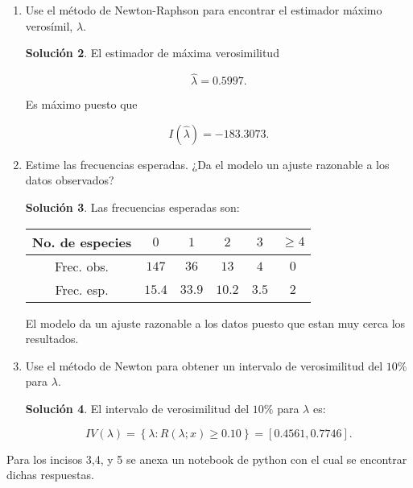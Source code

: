 \documentclass[letterpaper]{article}
\theoremstyle{definition}
\theoremstyle{lemathm}
\theoremstyle{lemathm}
\newtheorem{sol}{Solución}
\theoremstyle{lemathm}
\theoremstyle{lemademthm}
\newcommand{\pars}[1]{\left( #1 \right) }
\newcommand{\set}[1]{\left \{ #1 \right\} }
\newcommand{\1}{\mathbbm{1}}
\begin{document}
\begin{enumerate}
\begin{sol}
			\[I\pars{\lambda} = \frac{\pars{\sum_{j=0}^{\infty}\pars{j+1}f_j}e^{\lambda}}{\pars{e^{\lambda}-1}^2} - \frac{\pars{\sum_{j=0}^{\infty}f_j}}{\lambda^2},\]
		\end{sol}

		\item Use el método de Newton-Raphson para encontrar el estimador máximo verosímil, $\hat{\lambda}$.
		
		\begin{sol}
			El estimador de máxima verosimilitud 
			
			\[\hat{\lambda} = 0.5997.\]
			
			Es máximo puesto que 
			
			\[I\pars{\hat{\lambda}} = -183.3073.\]

		\end{sol}

		\item Estime las frecuencias esperadas. ¿Da el modelo un ajuste razonable a los datos observados?
		
		\begin{sol}
			Las frecuencias esperadas son:
			\begin{center}
				\begin{tabular}{|c|ccccc|}
					\hline
					No. de especies & $0$ & $1$ & $2$ & $3$ & $\geq 4$\\
					\hline
					Frec. obs. & $147$ & $36$ & $13$ & $4$ & $0$\\
					\hline
					Frec. esp. & $15.4$ & $33.9$ & $10.2$ & $3.5$ & $2$\\
					\hline
				\end{tabular}
			\end{center}
			El modelo da un ajuste razonable a los datos puesto que estan muy cerca los resultados.
		\end{sol}
		\item Use el método de Newton para obtener un intervalo de verosimilitud del $10\%$ para $\lambda$.
		
		\begin{sol}
			El intervalo de verosimilitud del $10\%$ para $\lambda$ es: 
			
			\[IV\pars{\lambda} = \set{ \lambda : R\pars{\lambda; x} \geq 0.10} = [0.4561,0.7746].\]
		\end{sol}
	\end{enumerate}

	Para los incisos 3,4, y 5 se anexa un notebook de python con el cual se encontrar dichas respuestas.
\end{document}
